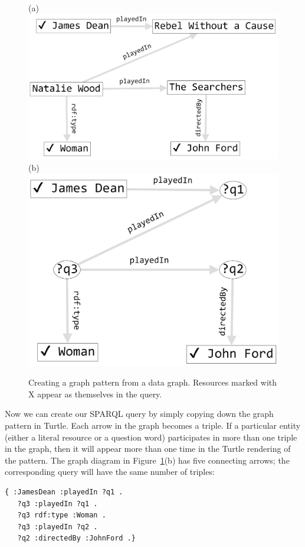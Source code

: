 \begin{figure}
\centering
(a)
\includegraphics[width=5in]{SWWOv3/media/ch6/figure6-7a.png}
(b)
\includegraphics[width=5in]{SWWOv3/media/ch6/figure6-7b.png}
\caption{Creating a graph pattern from a data graph. Resources marked with X appear as themselves in the query.}
\label{fig:ch6.7}
\end{figure}


Now we can create our SPARQL query by simply copying down the graph
pattern in Turtle. Each arrow in the graph becomes a triple. If a
particular entity (either a literal resource or a question word)
participates in more than one triple in the graph, then it will appear
more than one time in the Turtle rendering of the pattern. The graph
diagram in Figure~\ref{fig:ch6.7}(b) has five connecting arrows; the corresponding
query will have the same number of triples:

\begin{lstlisting}
{ :JamesDean :playedIn ?q1 .
   ?q3 :playedIn ?q1 .
   ?q3 rdf:type :Woman .
   ?q3 :playedIn ?q2 .
   ?q2 :directedBy :JohnFord .}
\end{lstlisting}

